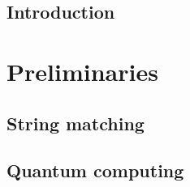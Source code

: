 \documentclass{report}
\begin{document}
            
            
            
            
            
            
            \afterpreface
            
            \dsp
            
            \chapter{Introduction}\label{chap-intro}
                        
            \part{Preliminaries}\label{part-prelim}
                \chapter{String matching}\label{chap-string}
                \chapter{Quantum computing}\label{chap-qc}
            
\end{document}
